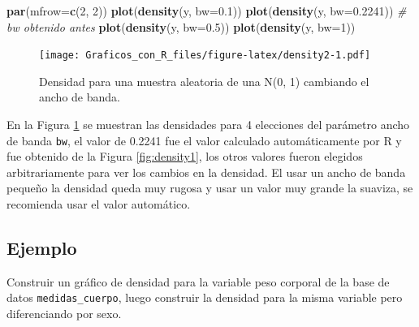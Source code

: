 \documentclass[10pt,]{krantz}
\makeatletter
\newenvironment{Shaded}{\begin{snugshade}}{\end{snugshade}}
\newcommand{\KeywordTok}[1]{\textcolor[rgb]{0.13,0.29,0.53}{\textbf{{#1}}}}
\newcommand{\DataTypeTok}[1]{\textcolor[rgb]{0.13,0.29,0.53}{{#1}}}
\newcommand{\DecValTok}[1]{\textcolor[rgb]{0.00,0.00,0.81}{{#1}}}
\newcommand{\FloatTok}[1]{\textcolor[rgb]{0.00,0.00,0.81}{{#1}}}
\newcommand{\CommentTok}[1]{\textcolor[rgb]{0.56,0.35,0.01}{\textit{{#1}}}}
\newcommand{\NormalTok}[1]{{#1}}
\let\proglang=\textsf
\newenvironment{kframe}{%
\medskip{}
\setlength{\fboxsep}{.8em}
 \def\at@end@of@kframe{}%
 \ifinner\ifhmode%
  \def\at@end@of@kframe{\end{minipage}}%
  \begin{minipage}{\columnwidth}%
 \fi\fi%
 \def\FrameCommand##1{\hskip\@totalleftmargin \hskip-\fboxsep
 \colorbox{shadecolor}{##1}\hskip-\fboxsep
     \hskip-\linewidth \hskip-\@totalleftmargin \hskip\columnwidth}%
 \MakeFramed {\advance\hsize-\width
   \@totalleftmargin\z@ \linewidth\hsize
   \@setminipage}}%
 {\par\unskip\endMakeFramed%
 \at@end@of@kframe}
\renewenvironment{Shaded}{\begin{kframe}}{\end{kframe}}
\makeatother
\begin{document}
\begin{Shaded}
\begin{Highlighting}[]
\KeywordTok{par}\NormalTok{(}\DataTypeTok{mfrow=}\KeywordTok{c}\NormalTok{(}\DecValTok{2}\NormalTok{, }\DecValTok{2}\NormalTok{))}
\KeywordTok{plot}\NormalTok{(}\KeywordTok{density}\NormalTok{(y, }\DataTypeTok{bw=}\FloatTok{0.1}\NormalTok{))}
\KeywordTok{plot}\NormalTok{(}\KeywordTok{density}\NormalTok{(y, }\DataTypeTok{bw=}\FloatTok{0.2241}\NormalTok{))  }\CommentTok{# bw obtenido antes}
\KeywordTok{plot}\NormalTok{(}\KeywordTok{density}\NormalTok{(y, }\DataTypeTok{bw=}\FloatTok{0.5}\NormalTok{))}
\KeywordTok{plot}\NormalTok{(}\KeywordTok{density}\NormalTok{(y, }\DataTypeTok{bw=}\DecValTok{1}\NormalTok{))}
\end{Highlighting}
\end{Shaded}

\begin{figure}[htbp]
\centering
\texttt{[image: Graficos\_con\_R\_files/figure-latex/density2-1.pdf]}
\caption{\label{fig:density2}Densidad para una muestra aleatoria de una N(0,
1) cambiando el ancho de banda.}
\end{figure}

En la Figura \ref{fig:density2} se muestran las densidades para 4
elecciones del parámetro ancho de banda \texttt{bw}, el valor de 0.2241
fue el valor calculado automáticamente por \proglang{R} y fue obtenido
de la Figura \ref{fig:density1}, los otros valores fueron elegidos
arbitrariamente para ver los cambios en la densidad. El usar un ancho de
banda pequeño la densidad queda muy rugosa y usar un valor muy grande la
suaviza, se recomienda usar el valor automático.

\subsection*{Ejemplo}\label{ejemplo-7}


Construir un gráfico de densidad para la variable peso corporal de la
base de datos \texttt{medidas\_cuerpo}, luego construir la densidad para
la misma variable pero diferenciando por sexo.
\end{document}
